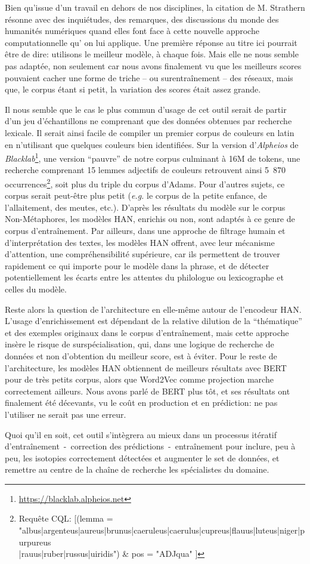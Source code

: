 Bien qu'issue d'un travail en dehors de nos disciplines, la citation de M. Strathern résonne avec des inquiétudes, des remarques, des discussions du monde des humanités numériques quand elles font face à cette nouvelle approche computationnelle qu’ on lui applique. Une première réponse au titre ici pourrait être de dire: utilisons le meilleur modèle, à chaque fois. Mais elle ne nous semble pas adaptée, non seulement car nous avons finalement vu que les meilleurs scores pouvaient cacher une forme de triche -- ou surentraînement -- des réseaux, mais que, le corpus étant si petit, la variation des scores était assez grande.

Il nous semble que le cas le plus commun d'usage de cet outil serait de partir d'un jeu d'échantillons ne comprenant que des données obtenues par recherche lexicale. Il serait ainsi facile de compiler un premier corpus de couleurs en latin en n'utilisant que quelques couleurs bien identifiées. Sur la version d'\textit{Alpheios} de \textit{Blacklab}\footnote{\url{https://blacklab.alpheios.net}}, une version \enquote{pauvre} de notre corpus culminant à 16M de tokens, une recherche comprenant 15 lemmes adjectifs de couleurs retrouvent ainsi 5~870 occurrences\footnote{Requête CQL: {[(lemma = "albus|argenteus|aureus|brunus|caeruleus|caerulus|cupreus|flauus|luteus|niger|purpureus\\|rauus|ruber|russus|uiridis") \& pos = "ADJqua" ]}}, soit plus du triple du corpus d'Adams. Pour d'autres sujets, ce corpus serait peut-être plus petit (\textit{e.g.} le corpus de la petite enfance, de l'allaitement, des meutes, etc.). D'après les résultats du modèle sur le corpus Non-Métaphores, les modèles HAN, enrichis ou non, sont adaptés à ce genre de corpus d'entraînement. Par ailleurs, dans une approche de filtrage humain et d'interprétation des textes, les modèles HAN offrent, avec leur mécanisme d'attention, une compréhensibilité supérieure, car ils permettent de trouver rapidement ce qui importe pour le modèle dans la phrase, et de détecter potentiellement les écarts entre les attentes du philologue ou lexicographe et celles du modèle. 

Reste alors la question de l'architecture en elle-même autour de l'encodeur HAN. L'usage d'enrichissement est dépendant de la relative dilution de la \enquote{thématique} et des exemples originaux dans le corpus d'entraînement, mais cette approche insère le risque de surspécialisation, qui, dans une logique de recherche de données et non d'obtention du meilleur score, est à éviter. Pour le reste de l'architecture, les modèles HAN obtiennent de meilleurs résultats avec BERT pour de très petits corpus, alors que Word2Vec comme projection marche correctement ailleurs. Nous avons parlé de BERT plus tôt, et ses résultats ont finalement été décevants, vu le coût en production et en prédiction: ne pas l'utiliser ne serait pas une erreur.

Quoi qu'il en soit, cet outil s'intègrera au mieux dans un processus itératif d'entraînement~-~correction des prédictions~-~entraînement pour inclure, peu à peu, les isotopies correctement détectées et augmenter le set de données, et remettre au centre de la chaîne de recherche les spécialistes du domaine.